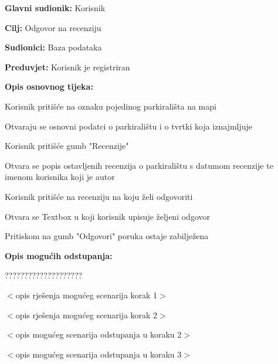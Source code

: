 \noindent {}
\begin{packed_item}
	
	\item \textbf{Glavni sudionik: }Korisnik
	\item  \textbf{Cilj:} Odgovor na recenziju
	\item  \textbf{Sudionici:} Baza podataka
	\item  \textbf{Preduvjet:} Korisnik je registriran
	\item  \textbf{Opis osnovnog tijeka:}
	
	\item[] \begin{packed_enum}
		
		\item Korisnik pritišće na oznaku pojedinog parkirališta na mapi
		\item Otvaraju se osnovni podatci o parkiralištu i o tvrtki koja iznajmljuje
		\item Korisnik pritišće gumb "Recenzije"
		\item Otvara se popis ostavljenih recenzija o parkiralištu s datumom recenzije te imenom korisnika koji je autor
		\item Korisnik pritišće na recenziju na koju želi odgovoriti
		\item Otvara se Textbox u koji korisnik upisuje željeni odgovor
		\item Pritiskom na gumb "Odgovori" poruka ostaje zabilježena
	\end{packed_enum}
	
	\item  \textbf{Opis mogućih odstupanja:}
	
	\item[] \begin{packed_item}
		
		\item[2.a] ????????????????????
		\item[] \begin{packed_enum}
			
			\item $<$opis rješenja mogućeg scenarija korak 1$>$
			\item $<$opis rješenja mogućeg scenarija korak 2$>$
			
		\end{packed_enum}
		\item[2.b] $<$opis mogućeg scenarija odstupanja u koraku 2$>$
		\item[3.a] $<$opis mogućeg scenarija odstupanja  u koraku 3$>$
		
	\end{packed_item}
\end{packed_item}


